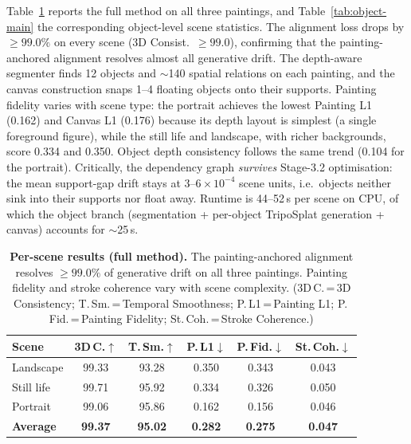 \documentclass[10pt,twocolumn,letterpaper]{article}
\begin{document}
Table~\ref{tab:main} reports the full method on all three paintings, and
Table~\ref{tab:object-main} the corresponding object-level scene statistics.
The alignment loss drops by $\geq\!99.0\%$ on every scene (3D Consist.\
$\geq 99.0$), confirming that the painting-anchored alignment resolves
almost all generative drift. The depth-aware segmenter finds 12 objects and
$\sim$140 spatial relations on each painting, and the canvas construction
snaps 1--4 floating objects onto their supports. Painting fidelity varies
with scene type: the portrait achieves the lowest Painting L1 (0.162) and
Canvas L1 (0.176) because its depth layout is simplest (a single foreground
figure), while the still life and landscape, with richer backgrounds, score
0.334 and 0.350. Object depth consistency follows the same trend (0.104 for
the portrait). Critically, the dependency graph \emph{survives} Stage-3.2
optimisation: the mean support-gap drift stays at $3$--$6\times10^{-4}$
scene units, i.e.\ objects neither sink into their supports nor float away.
Runtime is 44--52\,s per scene on CPU, of which the object branch
(segmentation + per-object TripoSplat generation + canvas) accounts for
$\sim$25\,s.

\begin{table}[t]
\centering
\scriptsize
\setlength{\tabcolsep}{3pt}
\begin{tabular*}{\linewidth}{@{\extracolsep{\fill}}lccccc}
\toprule
Scene & 3D\,C.$\uparrow$ & T.\,Sm.$\uparrow$ & P.\,L1$\downarrow$ & P.\,Fid.$\downarrow$ & St.\,Coh.$\downarrow$ \\
\midrule
Landscape   & 99.33 & 93.28 & 0.350 & 0.343 & 0.043 \\
Still life  & 99.71 & 95.92 & 0.334 & 0.326 & 0.050 \\
Portrait    & 99.06 & 95.86 & 0.162 & 0.156 & 0.046 \\
\midrule
\textbf{Average} & \textbf{99.37} & \textbf{95.02} & \textbf{0.282} & \textbf{0.275} & \textbf{0.047} \\
\bottomrule
\end{tabular*}
\caption{\textbf{Per-scene results (full method).} The painting-anchored
alignment resolves $\geq 99.0\%$ of generative drift on all three paintings.
Painting fidelity and stroke coherence vary with scene complexity.
(3D\,C.\,=\,3D Consistency; T.\,Sm.\,=\,Temporal Smoothness;
P.\,L1\,=\,Painting L1; P.\,Fid.\,=\,Painting Fidelity;
St.\,Coh.\,=\,Stroke Coherence.)}
\label{tab:main}
\end{table}
\end{document}

